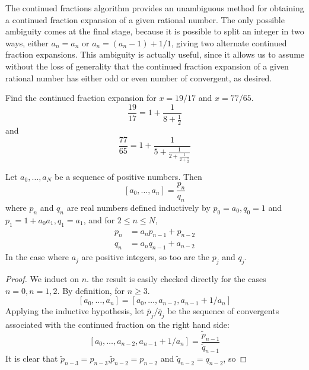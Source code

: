 The continued fractions algorithm provides an unambiguous method for obtaining a continued fraction expansion of a given rational number. The only possible ambiguity comes at the final stage, because it is possible to split an integer in two ways, either $a_n=a_n$ or $a_n=(a_n-1)+1/1$, giving two alternate continued fraction expansions. This ambiguity is actually useful, since it allows us to assume without the loss of generality that the continued fraction expansion of a given rational number has either odd or even number of convergent, as desired.

\begin{example}
    Find the continued fraction expansion for $x=19/17$ and $x=77/65$.
    \[
    \frac{19}{17}=1+\frac{1}{8+\frac{1}{2}}
    \]
    and
    \[
    \frac{77}{65}=1+\frac{1}{5+\frac{1}{2+\frac{1}{2+\frac{1}{2}}}}
    \]
\end{example}

\begin{theorem}
    Let $a_0,\ldots,a_N$ be a sequence of positive numbers. Then
    \[
    [a_0,\ldots,a_n]=\frac{p_n}{q_n}
    \]
    where $p_n$ and $q_n$ are real numbers defined inductively by $p_0=a_0,q_0=1$ and $p_1=1+a_0a_1,q_1=a_1$, and for $2\leq n\leq N$,
    \begin{align*}
    p_n&=a_np_{n-1}+p_{n-2}\\
q_n&=a_nq_{n-1}+a_{n-2}
    \end{align*}
    In the case where $a_j$ are positive integers, so too are the $p_j$ and $q_j$.
\end{theorem}
\begin{proof}
    We induct on $n$. the result is easily checked directly for the cases $n=0,n=1,2$. By definition, for $n\geq3$.
    \[
    [a_0,\ldots,a_n]=[a_0,\ldots,a_{n-2},a_{n-1}+1/a_n]
    \]
    Applying the inductive hypothesis, let $\tilde{p_j}/\tilde{q_j}$ be the sequence of convergents associated with the continued fraction on the right hand side:
    \[
    [a_0,\ldots,a_{n-2},a_{n-1}+1/a_n]=\frac{\tilde{p}_{n-1}}{\tilde{q}_{n-1}}
    \]
    It is clear that $\tilde{p}_{n-3}=p_{n-3}$,$\tilde{p}_{n-2}=p_{n-2}$ and $\tilde{q}_{n-2}=q_{n-2}$, so
    
\end{proof}




\chapterreferences
